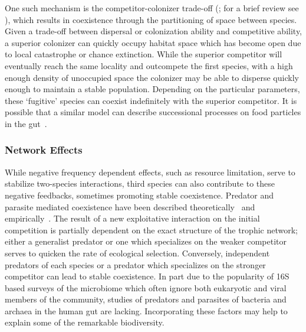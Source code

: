 \documentclass[12pt]{article}
\begin{document}
One such mechanism is the competitor-colonizer trade-off
(\citealp{Levins1971}; for a brief review see \citealp{Yu2001}),
which results in coexistence through the partitioning of space between species.
Given a trade-off between dispersal or colonization ability
and competitive ability,
a superior colonizer can quickly occupy habitat space which has become open
due to local catastrophe or chance extinction.
While the superior competitor will eventually reach the same locality
and outcompete the first species,
with a high enough density of unoccupied space
the colonizer may be able to disperse quickly enough to maintain a stable
population.
Depending on the particular parameters,
these `fugitive' species can coexist indefinitely with the superior competitor.
It is possible that a similar model can describe successional processes
on food particles in the gut~\citep{Macfarlane2006}.

\subsubsection{Network Effects}
While negative frequency dependent effects,
such as resource limitation,
serve to stabilize two-species interactions,
third species can also contribute to these negative feedbacks,
sometimes promoting stable coexistence.
Predator and parasite mediated coexistence have been described
theoretically~\citep{Caswell1978}
and empirically~\citep{Paine1966}.
The result of a new exploitative interaction on the initial
competition is partially dependent on the exact structure of the
trophic network;
either a generalist predator or one which specializes on the weaker
competitor serves to quicken the rate of ecological selection.
Conversely, independent predators of each species or a predator
which specializes on the stronger competitor can lead to stable
coexistence.
In part due to the popularity of 16S based surveys of the
microbiome
which often ignore both eukaryotic
and viral members of the community,
studies of predators and parasites of bacteria and archaea
in the human gut are lacking.
Incorporating these factors may help to explain some of the
remarkable biodiversity.
\end{document}
